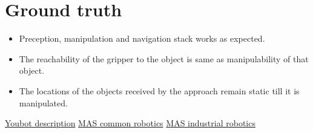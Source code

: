 \documentclass[12pt]{article}
\begin{document}
\section{Ground truth}
\begin{itemize}
    \item Preception, manipulation and navigation stack works as expected.
    \item The reachability of the gripper to the object is same as manipulability of that object.
    \item The locations of the objects received by the approach remain static till it is manipulated.
\end{itemize}

\begin{thebibliography}{1}
    \href{http://www.youbot-store.com/wiki/index.php/YouBot_Detailed_Specifications}{Youbot description}
    \href{http://www.github.com/b-it-bots/mas_common_robotics}{MAS common robotics}
    \href{https://github.com/b-it-bots/mas_industrial_robotics}{MAS industrial robotics}
    
\end{thebibliography}
\end{document}

